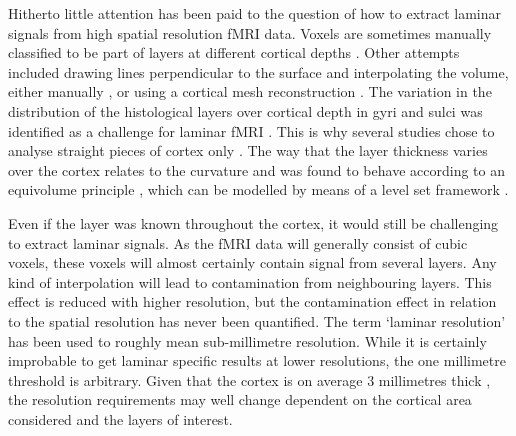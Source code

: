 Hitherto little attention has been paid to the question of how to extract laminar signals from high spatial resolution fMRI data. Voxels are sometimes manually classified to be part of layers at different cortical depths \cite[e.g.]{Siero2011,Olman2012,Maass2014}. Other attempts included drawing lines perpendicular to the surface and interpolating the volume, either manually \cite{Koopmans2010}, or using a cortical mesh reconstruction \cite[e.g.]{Koopmans2011,Polimeni2010,DeMartino2013}.
The variation in the distribution of the histological layers over cortical depth in gyri and sulci was identified as a challenge for laminar fMRI \cite{Ress2007}. This is why several studies chose to analyse straight pieces of cortex only \cite{Koopmans2010,Olman2012,DeMartino2013}. The way that the layer thickness varies over the cortex relates to the curvature and was found to behave according to an equivolume principle \cite{Bok1929,Waehnert2014}, which can be modelled by means of a level set framework \cite{Sethian1999}
\cite{Kleinnijenhuis2015}.

Even if the  layer  was known throughout the cortex, it would still be challenging to extract laminar signals. As the fMRI data will generally consist of cubic voxels, these voxels will almost certainly contain signal from several layers. Any kind of interpolation will lead to contamination from neighbouring layers. This effect is reduced with higher resolution, but the contamination effect in relation to the spatial resolution has never been quantified. The term `laminar resolution' \cite{Ugurbil2012,Huber2015} has been used to roughly mean sub-millimetre resolution. While it is certainly improbable to get laminar specific results at lower resolutions, the one millimetre threshold is arbitrary. Given that the cortex is on average 3 millimetres thick \cite{Zilles1990,Fischl2000}, the resolution requirements may well change dependent on the cortical area considered and the layers of interest. 

